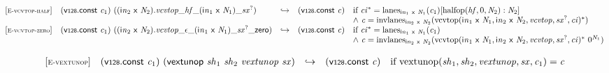 $$
\begin{array}{@{}l@{}lcl@{}l@{}}
{[\textsc{\scriptsize E{-}vcvtop{-}half}]} \quad & (\mathsf{v{\scriptstyle128}}.\mathsf{const}~{\mathit{c}}_{{1}})~(({{\mathsf{i}}{{\mathit{n}}}}_{{2}}~\mathsf{x}~{\mathit{N}}_{{2}}) . {{{{{{{\mathit{vcvtop}}}{\mathsf{\_}}}{{\mathit{hf}}}}{\mathsf{\_}}}{({{\mathsf{i}}{{\mathit{n}}}}_{{1}}~\mathsf{x}~{\mathit{N}}_{{1}})}}{\mathsf{\_}}}{{{\mathit{sx}}^?}}) &\hookrightarrow& (\mathsf{v{\scriptstyle128}}.\mathsf{const}~{\mathit{c}}) &\quad
  \mbox{if}~{{\mathit{ci}}^\ast} = {{\mathrm{lanes}}}_{{{\mathsf{i}}{{\mathit{n}}}}_{{1}}~\mathsf{x}~{\mathit{N}}_{{1}}}({\mathit{c}}_{{1}}){}[{\mathrm{halfop}}({\mathit{hf}}, 0, {\mathit{N}}_{{2}}) : {\mathit{N}}_{{2}}] \\
 &&&&\quad {\land}~{\mathit{c}} = {{\mathrm{invlanes}}}_{{{\mathsf{i}}{{\mathit{n}}}}_{{2}}~\mathsf{x}~{\mathit{N}}_{{2}}}({{\mathrm{vcvtop}}({{\mathsf{i}}{{\mathit{n}}}}_{{1}}~\mathsf{x}~{\mathit{N}}_{{1}}, {{\mathsf{i}}{{\mathit{n}}}}_{{2}}~\mathsf{x}~{\mathit{N}}_{{2}}, {\mathit{vcvtop}}, {{\mathit{sx}}^?}, {\mathit{ci}})^\ast}) \\
{[\textsc{\scriptsize E{-}vcvtop{-}zero}]} \quad & (\mathsf{v{\scriptstyle128}}.\mathsf{const}~{\mathit{c}}_{{1}})~(({{\mathsf{i}}{{\mathit{n}}}}_{{2}}~\mathsf{x}~{\mathit{N}}_{{2}}) . {{{{{{{{{\mathit{vcvtop}}}{\mathsf{\_}}}{\epsilon}}{\mathsf{\_}}}{({{\mathsf{i}}{{\mathit{n}}}}_{{1}}~\mathsf{x}~{\mathit{N}}_{{1}})}}{\mathsf{\_}}}{{{\mathit{sx}}^?}}}{\mathsf{\_}}}{\mathsf{zero}}) &\hookrightarrow& (\mathsf{v{\scriptstyle128}}.\mathsf{const}~{\mathit{c}}) &\quad
  \mbox{if}~{{\mathit{ci}}^\ast} = {{\mathrm{lanes}}}_{{{\mathsf{i}}{{\mathit{n}}}}_{{1}}~\mathsf{x}~{\mathit{N}}_{{1}}}({\mathit{c}}_{{1}}) \\
 &&&&\quad {\land}~{\mathit{c}} = {{\mathrm{invlanes}}}_{{{\mathsf{i}}{{\mathit{n}}}}_{{2}}~\mathsf{x}~{\mathit{N}}_{{2}}}({{\mathrm{vcvtop}}({{\mathsf{i}}{{\mathit{n}}}}_{{1}}~\mathsf{x}~{\mathit{N}}_{{1}}, {{\mathsf{i}}{{\mathit{n}}}}_{{2}}~\mathsf{x}~{\mathit{N}}_{{2}}, {\mathit{vcvtop}}, {{\mathit{sx}}^?}, {\mathit{ci}})^\ast}~{0^{{\mathit{N}}_{{1}}}}) \\
\end{array}
$$

\vspace{1ex}

$$
\begin{array}{@{}l@{}lcl@{}l@{}}
{[\textsc{\scriptsize E{-}vextunop}]} \quad & (\mathsf{v{\scriptstyle128}}.\mathsf{const}~{\mathit{c}}_{{1}})~(\mathsf{vextunop}~{\mathit{sh}}_{{1}}~{\mathit{sh}}_{{2}}~{\mathit{vextunop}}~{\mathit{sx}}) &\hookrightarrow& (\mathsf{v{\scriptstyle128}}.\mathsf{const}~{\mathit{c}}) &\quad
  \mbox{if}~{\mathrm{vextunop}}({\mathit{sh}}_{{1}}, {\mathit{sh}}_{{2}}, {\mathit{vextunop}}, {\mathit{sx}}, {\mathit{c}}_{{1}}) = {\mathit{c}} \\
\end{array}
$$

